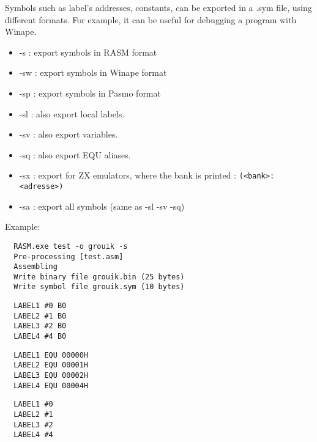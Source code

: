 \begin{xen}
Symbols such as label's addresses, constants, can be exported in a .sym file, using different formats.
For example, it can be useful for debugging a program with Winape.
  \begin{itemize}
    \item -s : export symbols in RASM format
    \item -sw :	export symbols in Winape format
    \item -sp :	export symbols in Pasmo format
    \item -sl :	also export local labels.
    \item -sv :	also export variables.
    \item -sq :	also export EQU aliases.
    \item -sx : export for ZX emulators, where the bank is printed :  \texttt{(<bank>:<adresse>)}
    \item -sa :	export all symbols (same as -sl -sv -sq)
  \end{itemize}
  Example:
\end{xen}

\begin{verbatim}
  RASM.exe test -o grouik -s
  Pre-processing [test.asm]
  Assembling
  Write binary file grouik.bin (25 bytes)
  Write symbol file grouik.sym (10 bytes)
\end{verbatim}


\begin{verbatim}
  LABEL1 #0 B0
  LABEL2 #1 B0
  LABEL3 #2 B0
  LABEL4 #4 B0
\end{verbatim}


\begin{verbatim}
  LABEL1 EQU 00000H
  LABEL2 EQU 00001H
  LABEL3 EQU 00002H
  LABEL4 EQU 00004H
\end{verbatim}


\begin{verbatim}
  LABEL1 #0
  LABEL2 #1
  LABEL3 #2
  LABEL4 #4
\end{verbatim}


